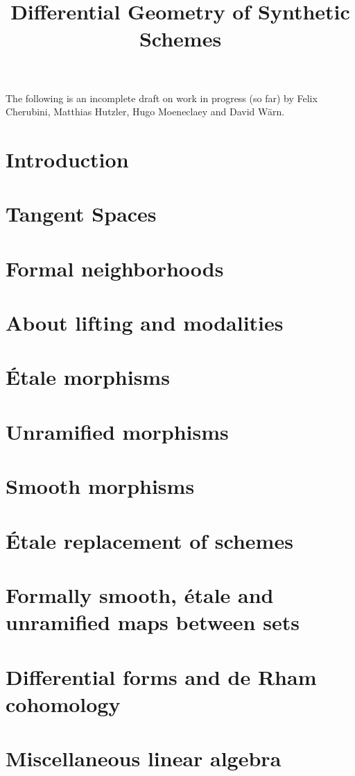 \documentclass{../util/zariski}
\title{Differential Geometry of Synthetic Schemes}
\begin{document}
\maketitle

The following is an incomplete draft on work in progress (so far)
by Felix Cherubini, Matthias Hutzler, Hugo Moeneclaey and David Wärn.

\tableofcontents

\section*{Introduction}


\section{Tangent Spaces}



\section{Formal neighborhoods}


\section{About lifting and modalities}


\section{Étale morphisms}


\section{Unramified morphisms}


\section{Smooth morphisms}


\section{Étale replacement of schemes}


\section{Formally smooth, étale and unramified maps between sets}


\section{Differential forms and de Rham cohomology}


\section{Miscellaneous linear algebra}


\printindex

\printbibliography
\end{document}
